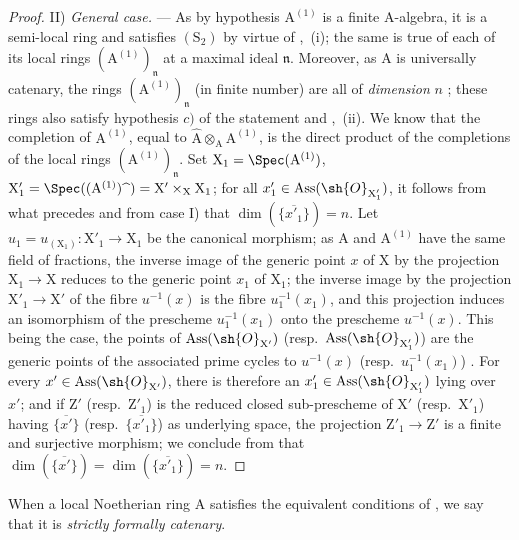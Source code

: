 \begin{proof}
\medskip\noindent
II) \emph{General case.} ---
As by hypothesis $\mathrm{A}^{(1)}$ is a finite A-algebra, it is a semi-local ring and satisfies $(\mathrm{S}_2)$ by virtue of ,~(i); the same is true of each of its local rings $({\mathrm{A}^{(1)}})_\mathfrak{n}$ at a maximal ideal $\mathfrak{n}$.
Moreover, as $\mathrm{A}$ is universally catenary, the rings $({\mathrm{A}^{(1)}})_\mathfrak{n}$ (in finite number) are all of \emph{dimension} $n$ ; these rings also satisfy hypothesis $c)$ of the statement  and ,~(ii).
We know that the completion of $\mathrm{A}^{(1)}$, equal to $\widehat{\mathrm{A}}\otimes_\mathrm{A}\mathrm{A}^{(1)}$, is the direct product of the completions of the local rings $(\mathrm{A}^{(1)})_\mathfrak{n}$.
Set $\mathrm{X}_1=\Spec(\mathrm{A}^{(1)})$, $\mathrm{X}'_1=\Spec((\mathrm{A}^{(1)})\widehat{\phantom{x}})=\mathrm{X}'\times_\mathrm{X}\mathrm{X}_1$; for all $x'_1\in\operatorname{Ass}(\sh{O}_{\mathrm{X}'_1})$, it follows from what precedes and from case I) that $\dim(\overline{\{x'_1\}})=n$.
Let $u_1=u_{(\mathrm{X}_1)}:\mathrm{X}'_1\to\mathrm{X}_1$ be the canonical morphism; as $\mathrm{A}$ and $\mathrm{A}^{(1)}$ have the same field of fractions, the inverse image of the generic point $x$ of $\mathrm{X}$ by the projection $\mathrm{X}_1\to\mathrm{X}$ reduces to the generic point $x_1$ of $\mathrm{X}_1$; the inverse image by the projection $\mathrm{X}'_1\to\mathrm{X}'$ of the fibre $u^{-1}(x)$ is the fibre $u_1^{-1}(x_1)$, and this projection induces an isomorphism of the prescheme $u_1^{-1}(x_1)$ onto the prescheme $u^{-1}(x)$.
This being the case, the points of $\operatorname{Ass}(\sh{O}_{\mathrm{X}'})$ (resp.~$\operatorname{Ass}(\sh{O}_{\mathrm{X}'_1})$) are the generic points of the associated prime cycles to $u^{-1}(x)$ (resp.~$u_1^{-1}(x_1)$) .
For every $x'\in\operatorname{Ass}(\sh{O}_{\mathrm{X}'})$, there is therefore an $x'_1\in\operatorname{Ass}(\sh{O}_{\mathrm{X}'_1})$ lying over $x'$; and if $\mathrm{Z}'$ (resp.~$\mathrm{Z}'_1$) is the reduced closed sub-prescheme of $\mathrm{X}'$ (resp.~$\mathrm{X}'_1$) having $\overline{\{x'\}}$ (resp.~$\overline{\{x'_1\}}$) as underlying space, the projection $\mathrm{Z}'_1\to\mathrm{Z}'$ is a finite and surjective morphism; we conclude from  that $\dim(\overline{\{x'\}})=\dim(\overline{\{x'_1\}})=n$.
\end{proof}

\begin{definition}[7.2.6]
\label{IV.7.2.6}
When a local Noetherian ring $\mathrm{A}$ satisfies the equivalent conditions of , we say that it is \emph{strictly formally catenary}.
\end{definition}

